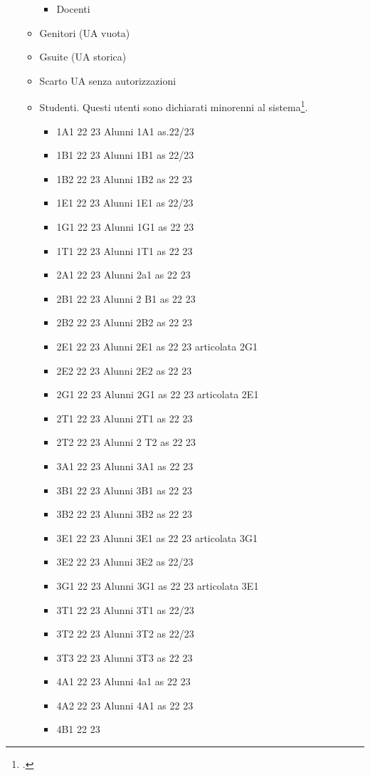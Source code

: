 \begin{itemize}
\begin{itemize}
\begin{itemize}
	\item Docenti
\end{itemize}
\item Genitori (UA vuota)
\item Gsuite (UA storica)
\item Scarto UA senza autorizzazioni
\item Studenti. Questi utenti sono dichiarati minorenni al sistema\footcite{Google2021b}.
\begin{itemize}
	\item 1A1 22 23
	Alunni 1A1 as.22/23
	\item 1B1 22 23
	Alunni 1B1 as 22/23
	\item 1B2 22 23
	Alunni 1B2 as 22 23
	\item 1E1 22 23
	Alunni 1E1 as 22/23	
	\item 1G1 22 23
	Alunni 1G1 as 22 23	
	\item 1T1 22 23
	Alunni 1T1 as 22 23	
	\item 2A1 22 23
	Alunni 2a1 as 22 23	
	\item 2B1 22 23
	Alunni 2 B1 as 22 23	
	\item 2B2 22 23
	Alunni 2B2 as 22 23	
	\item 2E1 22 23
	Alunni 2E1 as 22 23 articolata 2G1	
	\item 2E2 22 23
	Alunni 2E2 as 22 23	
	\item 2G1 22 23
	Alunni 2G1 as 22 23 articolata 2E1	
	\item 2T1 22 23
	Alunni 2T1 as 22 23	
	\item 2T2 22 23
	Alunni 2 T2 as 22 23	
	\item 3A1 22 23
	Alunni 3A1 as 22 23	
	\item 3B1 22 23
	Alunni 3B1 as 22 23	
	\item 3B2 22 23
	Alunni 3B2 as 22 23	
	\item 3E1 22 23
	Alunni 3E1 as 22 23 articolata 3G1	
	\item 3E2 22 23
	Alunni 3E2 as 22/23	
	\item 3G1 22 23
	Alunni 3G1 as 22 23 articolata 3E1	
	\item 3T1 22 23
	Alunni 3T1 as 22/23	
	\item 3T2 22 23
	Alunni 3T2 as 22/23	
	\item 3T3 22 23
	Alunni 3T3 as 22 23	
	\item 4A1 22 23
	Alunni 4a1 as 22 23	
	\item 4A2 22 23
	Alunni 4A1 as 22 23	
	\item 4B1 22 23

\end{itemize}
\end{itemize}
\end{itemize}

